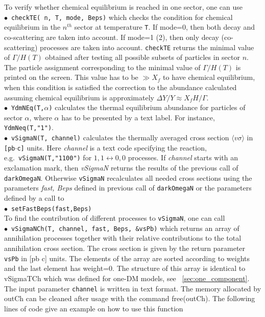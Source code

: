 \documentclass[12pt,a4paper]{article}
\begin{document}
To verify whether  chemical equilibrium is reached in one sector, one can use \\                
 $\bullet$~\verb|checkTE( n, T, mode, Beps)|  which  checks the condition for chemical equilibrium  in the $n^{th}$  sector at temperature \verb|T|.
     If mode=0, then both decay and  co-scattering are taken into account. If mode=1 (2),  then only decay (co-scattering) processes are taken
       into account.  \verb|checkTE|  returns  the minimal value of $\Gamma/H(T)$ obtained after testing all possible subsets of particles in sector $n$. The particle assignment corresponding to the minimal value of $\Gamma/H(T)$  is printed on the screen. This value has to be $\gg X_f$ to have chemical equilibrium, when this condition is satisfied  
        the correction to the abundance calculated assuming chemical equilibrium is approximately 
       $\Delta Y/Y\approx X_f H/ \Gamma$.    \\
 $\bullet$~\verb|YdmNEq(T,|$\alpha${\tt)}  calculates the thermal equilibrium 
abundance %
for particles of sector $\alpha$, where $\alpha$  has to be presented by a text label. For instance, {\tt YdmNeq(T,"1")}.
\\
$\bullet$~\verb|vSigmaN(T, channel)|  calculates %
the thermally averaged  cross section  $\langle v\sigma \rangle$  in  {\tt [pb$\cdot$c]} units.  
Here {\it channel } is a  text code specifying the reaction, e.g.\ \verb|vSigmaN(T,"1100")| 
for $1,1 \leftrightarrow 0,0$ processes. 
 If {\it channel}  starts with an exclamation mark, then {\it vSigmaN} 
returns the results of the previous call of {\tt darkOmegaN}. Otherwise  {\tt vSigmaN}  recalculates all needed cross sections  
using the  parameters {\it fast, Beps} defined 
in previous call of {\tt darkOmegaN} or the parameters defined by a call to  
\\
$\bullet$~\verb|setFastBeps(fast,Beps)|\\

 

To find the contribution of  different processes to  {\tt vSigmaN},  one can call
\\
\noindent
$\bullet$~\verb|vSigmaNCh(T, channel, fast, Beps, &vsPb)|  which  returns an array of annihilation processes   together with their relative  contributions  to the  total annihilation  cross section.   The cross section is given by the return parameter   \verb|vsPb|  in [pb c] units. The
    elements of the array are  sorted according to weights and the last element has weight=0.  The structure of this array is
      identical to vSigmaTCh which was defined for one-DM models, see ~\ref{sec:one_component}. The input parameter  \verb|channel| is written in text format.
      The memory allocated by  outCh  can be  cleaned after usage with the command free(outCh).   
The following lines of code give an example on how to use this function \\
\end{document}
